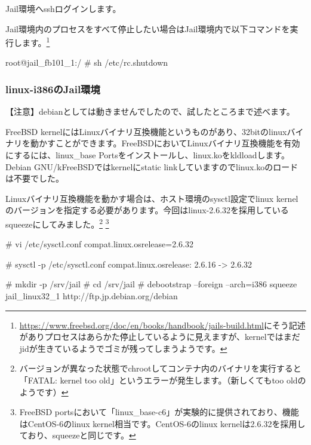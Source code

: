\documentclass[mingoth,a4paper]{jsarticle}
\begin{document}
Jail環境へsshログインします。


Jail環境内のプロセスをすべて停止したい場合はJail環境内で以下コマンドを実行します。\footnote{\url{https://www.freebsd.org/doc/en/books/handbook/jails-build.html}にそう記述がありプロセスはあらかた停止しているように見えますが、kernelではまだjidが生きているようでゴミが残ってしまうようです。}

\begin{commandline}
root@jail_fb101_1:/ # sh /etc/rc.shutdown
\end{commandline}


\subsubsection{linux-i386のJail環境}

【注意】debianとしては動きませんでしたので、試したところまで述べます。


FreeBSD kernelにはLinuxバイナリ互換機能というものがあり、32bitのlinuxバイナリを動かすことができます。FreeBSDにおいてLinuxバイナリ互換機能を有効にするには、linux\_base Portsをインストールし、linux.koをkldloadします。Debian GNU/kFreeBSDではkernelにstatic linkしていますのでlinux.koのロードは不要でした。

Linuxバイナリ互換機能を動かす場合は、ホスト環境のsysctl設定でlinux kernelのバージョンを指定する必要があります。今回はlinux-2.6.32を採用しているsqueezeにしてみました。\footnote{バージョンが異なった状態でchrootしてコンテナ内のバイナリを実行すると「FATAL: kernel too old」というエラーが発生します。（新しくてもtoo oldのようです）} \footnote{FreeBSD portsにおいて「linux\_base-c6」が実験的に提供されており、機能はCentOS-6のlinux kernel相当です。CentOS-6のlinux kernelは2.6.32を採用しており、squeezeと同じです。}

\begin{commandline}
# vi /etc/sysctl.conf
compat.linux.osrelease=2.6.32

# sysctl -p /etc/sysctl.conf
compat.linux.osrelease: 2.6.16 -> 2.6.32
\end{commandline}


\begin{commandline}
# mkdir -p /srv/jail
# cd /srv/jail
# debootstrap --foreign --arch=i386 squeeze jail_linux32_1 http://ftp.jp.debian.org/debian
\end{commandline}
\end{document}
